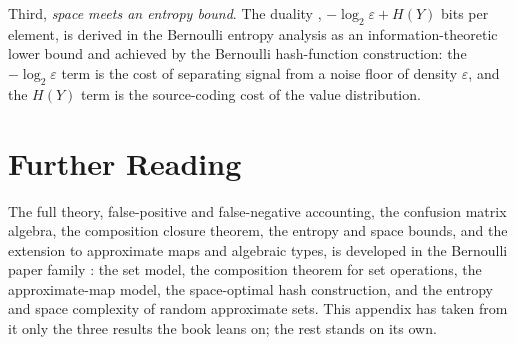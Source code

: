 Third, \emph{space meets an entropy bound}. The duality
, $-\log_2\varepsilon + H(Y)$ bits per element, is
derived in the Bernoulli entropy analysis as an information-theoretic lower
bound and achieved by the Bernoulli hash-function construction: the
$-\log_2\varepsilon$ term is the cost of separating signal from a noise floor
of density $\varepsilon$, and the $H(Y)$ term is the source-coding cost of
the value distribution.

\section{Further Reading}
\label{sec:bernoulli-further}

The full theory, false-positive and false-negative accounting, the confusion
matrix algebra, the composition closure theorem, the entropy and space
bounds, and the extension to approximate maps and algebraic types, is
developed in the Bernoulli paper family \cite{towell2026bernoulli}: the set
model, the composition theorem for set operations, the approximate-map model,
the space-optimal hash construction, and the entropy and space complexity of
random approximate sets. This appendix has taken from it only the three
results the book leans on; the rest stands on its own.
